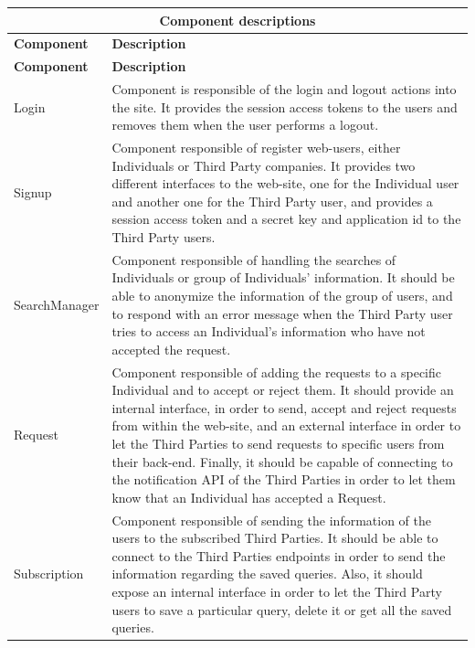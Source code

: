 \documentclass[a4paper, hidelinks, 12pt]{report}
\begin{document}
		\begin{longtable}{l p{}}
			\hline\hline
			\multicolumn{2}{c}{\textbf{Component descriptions}} \\
			\hline
			\textbf{Component} & \textbf{Description} \\ [0.5ex]
			\hline
			\endfirsthead
			\hline
			\textbf{Component} & \textbf{Description} \\ [0.5ex]
			\hline
			\endhead
			Login & Component is responsible of the login and logout actions into the site. It provides the session access tokens to the users and removes them when the user performs a logout. \\
			
			Signup & Component responsible of register web-users, either Individuals or Third Party companies. It provides two different interfaces to the web-site, one for the Individual user and another one for the Third Party user, and provides a session access token and a secret key and application id to the Third Party users. \\
			
			SearchManager & Component responsible of handling the searches of Individuals or group of Individuals' information. It should be able to anonymize the information of the group of users, and to respond with an error message when the Third Party user tries to access an Individual's information who have not accepted the request. \\
			
			Request & Component responsible of adding the requests to a specific Individual and to accept or reject them. It should provide an internal interface, in order to send, accept and reject requests from within the web-site, and an external interface in order to let the Third Parties to send requests to specific users from their back-end. Finally, it should be capable of connecting to the notification API of the Third Parties in order to let them know that an Individual has accepted a Request.\\
			
			Subscription & Component responsible of sending the information of the users to the subscribed Third Parties. It should be able to connect to the Third Parties endpoints in order to send the information regarding the saved queries. Also, it should expose an internal interface in order to let the Third Party users to save a particular query, delete it or get all the saved queries.\\
			

\end{longtable}
\end{document}
